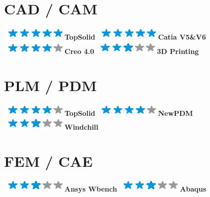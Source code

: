 \documentclass[]{friggeri-cv}
\begin{document}
\begin{aside}
\section{CAD / CAM}
\includegraphics[scale=0.40]{res/img/5stars.png}\hspace{1.5mm}\textbf{TopSolid}
\includegraphics[scale=0.40]{res/img/5stars.png}\hspace{1.5mm}\textbf{Catia V5\&V6}
\includegraphics[scale=0.40]{res/img/4stars.png}\hspace{1.5mm}\textbf{Creo 4.0}
\includegraphics[scale=0.40]{res/img/3stars.png}\hspace{1.5mm}\textbf{3D Printing}\section{PLM / PDM}
\includegraphics[scale=0.40]{res/img/4stars.png}\hspace{1.5mm}\textbf{TopSolid}
\includegraphics[scale=0.40]{res/img/4stars.png}\hspace{1.5mm}\textbf{NewPDM}
\includegraphics[scale=0.40]{res/img/3stars.png}\hspace{1.5mm}\textbf{Windchill}\section{FEM / CAE}
\includegraphics[scale=0.40]{res/img/3stars.png}\hspace{1.5mm}\textbf{Ansys Wbench}
\includegraphics[scale=0.40]{res/img/3stars.png}\hspace{1.5mm}\textbf{Abaqus}

\end{aside}
\end{document}
